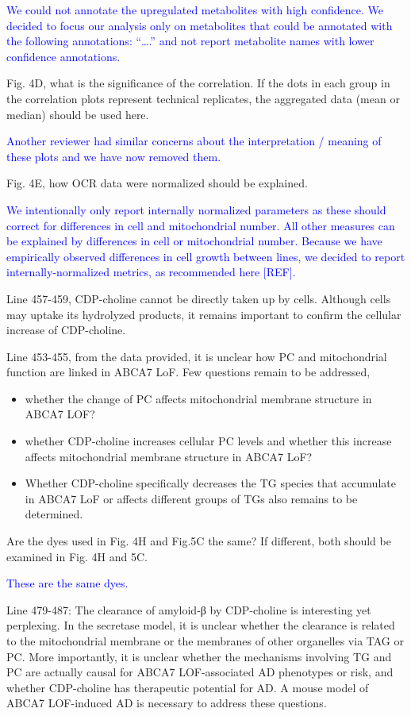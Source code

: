 \textcolor{blue}{We could not annotate the upregulated metabolites with high confidence. We decided to focus our analysis only on metabolites that could be annotated with the following annotations: “….” and not report metabolite names with lower confidence annotations.}

Fig. 4D, what is the significance of the correlation. If the dots in each group in the correlation plots represent technical replicates, the aggregated data (mean or median) should be used here.

\textcolor{blue}{Another reviewer had similar concerns about the interpretation / meaning of these plots and we have now removed them.}

Fig. 4E, how OCR data were normalized should be explained.

\textcolor{blue}{We intentionally only report internally normalized parameters as these should correct for differences in cell and mitochondrial number. All other measures can be explained by differences in cell or mitochondrial number. Because we have empirically observed differences in cell growth between lines, we decided to report internally-normalized metrics, as recommended here [REF].}

Line 457-459, CDP-choline cannot be directly taken up by cells. Although cells may uptake its hydrolyzed products, it remains important to confirm the cellular increase of CDP-choline.

Line 453-455, from the data provided, it is unclear how PC and mitochondrial function are linked in ABCA7 LoF. Few questions remain to be addressed,
\begin{itemize}
	\item whether the change of PC affects mitochondrial membrane structure in ABCA7 LOF?
	\item whether CDP-choline increases cellular PC levels and whether this increase affects mitochondrial membrane structure in ABCA7 LoF?
	\item Whether CDP-choline specifically decreases the TG species that accumulate in ABCA7 LoF or affects different groups of TGs also remains to be determined.
\end{itemize}

Are the dyes used in Fig. 4H and Fig.5C the same? If different, both should be examined in Fig. 4H and 5C.

\textcolor{blue}{These are the same dyes.}

Line 479-487: The clearance of amyloid-β by CDP-choline is interesting yet perplexing. In the secretase model, it is unclear whether the clearance is related to the mitochondrial membrane or the membranes of other organelles via TAG or PC. More importantly, it is unclear whether the mechanisms involving TG and PC are actually causal for ABCA7 LOF-associated AD phenotypes or risk, and whether CDP-choline has therapeutic potential for AD. A mouse model of ABCA7 LOF-induced AD is necessary to address these questions.

